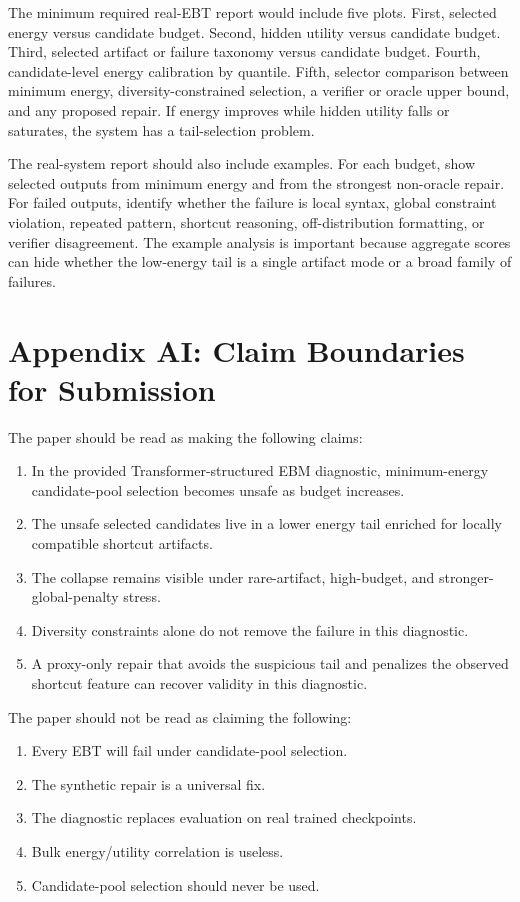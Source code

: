 \documentclass{article}
\begin{document}
The minimum required real-EBT report would include five plots. First, selected
energy versus candidate budget. Second, hidden utility versus candidate budget.
Third, selected artifact or failure taxonomy versus candidate budget. Fourth,
candidate-level energy calibration by quantile. Fifth, selector comparison
between minimum energy, diversity-constrained selection, a verifier or oracle
upper bound, and any proposed repair. If energy improves while hidden utility
falls or saturates, the system has a tail-selection problem.

The real-system report should also include examples. For each budget, show
selected outputs from minimum energy and from the strongest non-oracle repair.
For failed outputs, identify whether the failure is local syntax, global
constraint violation, repeated pattern, shortcut reasoning, off-distribution
formatting, or verifier disagreement. The example analysis is important
because aggregate scores can hide whether the low-energy tail is a single
artifact mode or a broad family of failures.

\section*{Appendix AI: Claim Boundaries for Submission}

The paper should be read as making the following claims:
\begin{enumerate}
  \item In the provided Transformer-structured EBM diagnostic, minimum-energy
  candidate-pool selection becomes unsafe as budget increases.
  \item The unsafe selected candidates live in a lower energy tail enriched for
  locally compatible shortcut artifacts.
  \item The collapse remains visible under rare-artifact, high-budget, and
  stronger-global-penalty stress.
  \item Diversity constraints alone do not remove the failure in this
  diagnostic.
  \item A proxy-only repair that avoids the suspicious tail and penalizes the
  observed shortcut feature can recover validity in this diagnostic.
\end{enumerate}

The paper should not be read as claiming the following:
\begin{enumerate}
  \item Every EBT will fail under candidate-pool selection.
  \item The synthetic repair is a universal fix.
  \item The diagnostic replaces evaluation on real trained checkpoints.
  \item Bulk energy/utility correlation is useless.
  \item Candidate-pool selection should never be used.
\end{enumerate}
\end{document}
